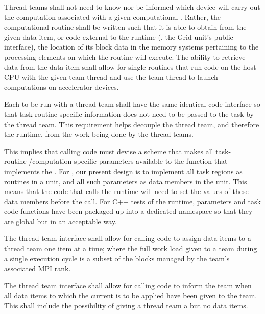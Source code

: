 \documentclass{article}
\begin{document}
\begin{req}
\label{req:ThreadTeamEncapsulation}
Thread teams shall not need to know nor be informed which device will carry
out the computation associated with a given computational \taskroutine.  Rather,
the computational routine shall be written such that it is able to obtain from
the given data item, or code external to the runtime (\eg, the Grid unit's public
interface), the location of its block data in the memory systems pertaining to
the processing elements on which the routine will execute.  The ability to
retrieve data from the data item shall allow for single routines that run code
on the host CPU with the given team thread and use the team thread to launch
computations on accelerator devices.
\end{req}

\begin{req}
Each \taskroutine to be run with a thread team shall have the same identical code
interface so that task-routine-specific information does not need to be passed to the
task by the thread team.  This requirement helps decouple the thread team, and
therefore the runtime, from the work being done by the thread teams.
\end{req}

This implies that calling code must devise a scheme that makes all
task-routine-/computation-specific parameters available to the function that implements the
\taskroutine.  For \FlashOfTheFuture, our present design is to implement all task regions as
routines in a unit, and all such parameters as data members in the unit.  This
means that the code that calls the runtime will need to set the values of these
data members before the call.  For C++ tests of the runtime, \taskroutine parameters
and task code functions have been packaged up into a dedicated namespace so that they
are global but in an acceptable way.


\begin{req}
The thread team interface shall allow for calling code to assign data items
to a thread team one item at a time; where the full work load given to a
team during a single execution cycle is a subset of the blocks managed by the
team's associated MPI rank.
\end{req}

\begin{req}
The thread team interface shall allow for calling code to inform the team when
all data items to which the current \taskroutine is to be applied have been given to
the team.  This shall include the possibility of giving a thread team a \taskroutine but
no data items.
\end{req}
\end{document}
